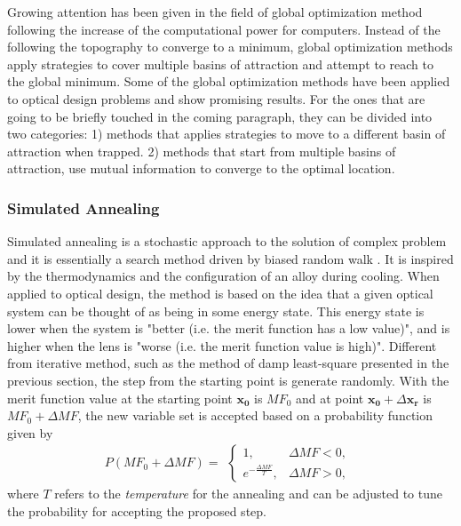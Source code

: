 Growing attention has been given in the field of global optimization method following the increase of the computational power for computers. Instead of the following the topography to converge to a minimum, global optimization methods apply strategies to cover multiple basins of attraction and attempt to reach to the global minimum. Some of the global optimization methods have been applied to optical design problems and show promising results. For the ones that are going to be briefly touched in the coming paragraph, they can be divided into two categories: 1) methods that applies strategies to move to a different basin of attraction when trapped. 2) methods that start from multiple basins of attraction, use mutual information to converge to the optimal location. 

\subsubsection{Simulated Annealing}
Simulated annealing is a stochastic approach to the solution of complex problem and it is essentially a search method driven by biased random walk \cite{WELLER:87}. It is inspired by the thermodynamics and the configuration of an alloy during cooling. When applied to optical design, the method is based on the idea that a given optical system can be thought of as being in some energy state. This energy state is lower when the system is "better (i.e. the merit function has a low value)", and is higher when the lens is "worse (i.e. the merit function value is high)". Different from iterative method, such as the method of damp least-square presented in the previous section, the step from the starting point is generate randomly. With the merit function value at the starting point $\pmb{x_0}$ is $MF_0$ and at point $\pmb{x_0} + \Delta\pmb{x_r}$ is $MF_0 + \Delta MF$, the new variable set is accepted based on a probability function \cite{Forbes1991} given by 
\begin{equation} \label{eq: simualted_annealing_probability }
P(MF_0 + \Delta MF) = 
\begin{align}
\begin{cases}
  1, & \Delta MF < 0, \\ 
 e^{-\frac{\Delta MF}{T}}, & \Delta MF > 0,
\end{cases}
\end{align}
\end{equation}where $T$ refers to the \textit{temperature} for the annealing and can be adjusted to tune the probability for accepting the proposed step. 

